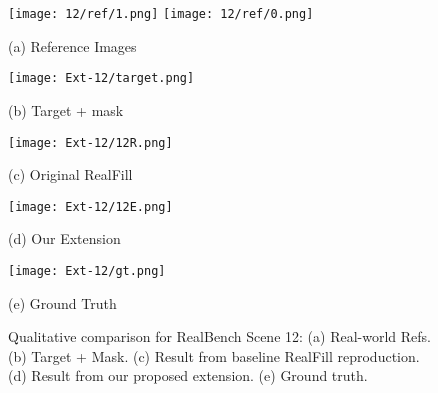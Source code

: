 \documentclass{article}
\begin{document}
\begin{figure}[H]
    \centering
    \begin{minipage}[b]{0.19\textwidth}
        \centering
        \texttt{[image: 12/ref/1.png]}
        \texttt{[image: 12/ref/0.png]}
        \caption*{(a) Reference Images}
    \end{minipage}\hfill%
    \begin{minipage}[b]{0.19\textwidth}
        \centering
        \texttt{[image: Ext-12/target.png]}
        \caption*{(b) Target + mask}
    \end{minipage}\hfill%
    \begin{minipage}[b]{0.19\textwidth}
        \centering
        \texttt{[image: Ext-12/12R.png]}
        \caption*{(c) Original RealFill}
    \end{minipage}\hfill%
    \begin{minipage}[b]{0.19\textwidth}
        \centering
        \texttt{[image: Ext-12/12E.png]}
        \caption*{(d) Our Extension}
    \end{minipage}\hfill%
    \begin{minipage}[b]{0.19\textwidth}
        \centering
        \texttt{[image: Ext-12/gt.png]}
        \caption*{(e) Ground Truth}
    \end{minipage}
    \caption{Qualitative comparison for RealBench Scene 12: (a) Real-world Refs. (b) Target + Mask. (c) Result from baseline RealFill reproduction. (d) Result from our proposed extension. (e) Ground truth.}
\end{figure}
\end{document}
